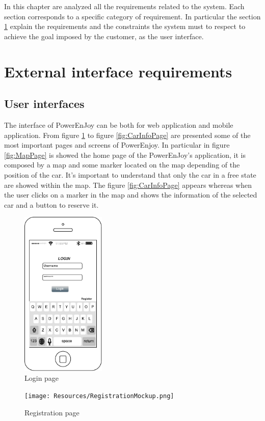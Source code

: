 In this chapter are analyzed all the requirements related to the system. Each section corresponds to a specific category of requirement. In particular the section \ref{sec:ExternalInterface} explain the requirements and the constraints the system must to respect to achieve the goal imposed by the customer, as the user interface.
\section{External interface requirements}\label{sec:ExternalInterface}
\subsection{User interfaces}
The interface of PowerEnJoy can be both for web application and mobile application. From figure \ref{fig:LogPage} to figure \ref{fig:CarInfoPage} are presented some of the most important pages and screens of PowerEnjoy. In particular in figure \ref{fig:MapPage} is showed the home page of the PowerEnJoy's application, it is composed by a map and some marker located on the map depending of the position of the car. It's important to understand that only the car in a free state are showed within the map. The figure \ref{fig:CarInfoPage} appears whereas when the user clicks on a marker in the map and shows the information of the selected car and a button to reserve it.
	\begin{figure}[H]
		\centering
		\includegraphics[height=8cm]{Resources/LoginMockup.pdf}
		\caption{Login page}
		 \label{fig:LogPage}
	\end{figure}
	\begin{figure}[H]
		\centering
		\texttt{[image: Resources/RegistrationMockup.png]}
		\caption{Registration page}
		 \label{fig:RegistrationPage}
	\end{figure}
